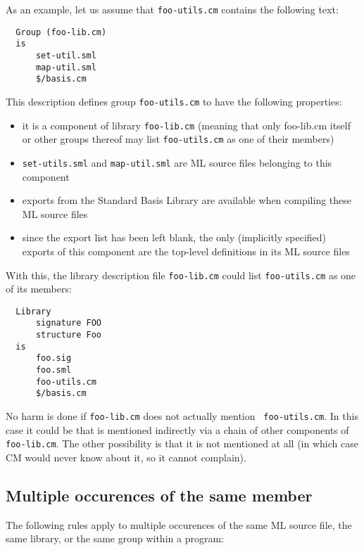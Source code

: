 \documentclass[titlepage,letterpaper]{article}
\begin{document}
As an example, let us assume that
{\tt foo-utils.cm} contains the following text:

\begin{verbatim}
  Group (foo-lib.cm)
  is
      set-util.sml
      map-util.sml
      $/basis.cm
\end{verbatim}

This description defines group {\tt foo-utils.cm} to have the
following properties:

\begin{itemize}
\item it is a component of library {\tt foo-lib.cm} (meaning that only
foo-lib.cm itself or other groups thereof may list {\tt foo-utils.cm} as one
of their members)
\item {\tt set-utils.sml} and {\tt map-util.sml} are ML source files
belonging to this component
\item exports from the Standard Basis Library are available when
compiling these ML source files
\item since the export list has been left blank, the only (implicitly
specified) exports of this component are the top-level definitions in
its ML source files
\end{itemize}

With this, the library description file {\tt foo-lib.cm} could list
{\tt foo-utils.cm} as one of its members:

\begin{verbatim}
  Library
      signature FOO
      structure Foo
  is
      foo.sig
      foo.sml
      foo-utils.cm
      $/basis.cm
\end{verbatim}

No harm is done if {\tt foo-lib.cm} does not actually mention {\tt
foo-utils.cm}.  In this case it could be that is mentioned indirectly via a chain of other components
of {\tt foo-lib.cm}.  The other possibility is that it is not
mentioned at all (in which case CM would never know about it, so it
cannot complain).

\subsection{Multiple occurences of the same member}
\label{sec:multioccur}

The following rules apply to multiple occurences of the same ML source
file, the same library, or the same group within a program:
\end{document}
